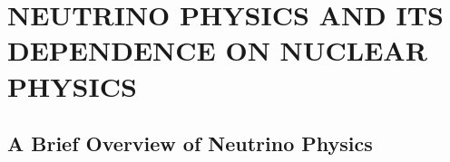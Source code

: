 %
%
%
%
%
%
%
%


%
%

\chapter{NEUTRINO PHYSICS AND ITS DEPENDENCE ON NUCLEAR PHYSICS}
\label{chap:0vbb}
\section{A Brief Overview of Neutrino Physics}

